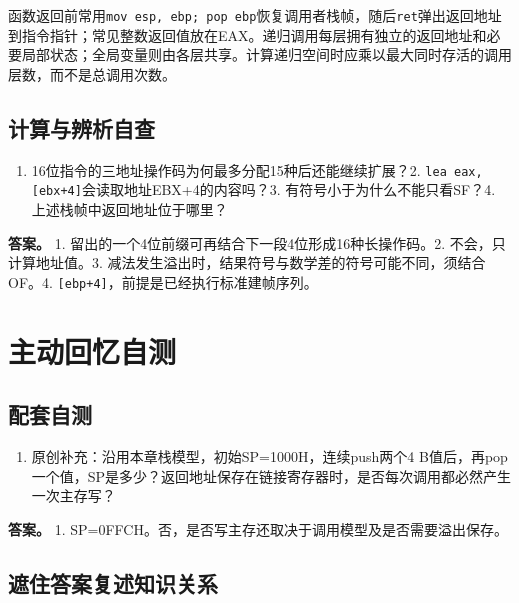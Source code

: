 函数返回前常用\texttt{mov esp,\allowbreak{} ebp;\allowbreak{} pop ebp}恢复调用者栈帧，随后\texttt{ret}弹出返回地址到指令指针；常见整数返回值放在EAX。递归调用每层拥有独立的返回地址和必要局部状态；全局变量则由各层共享。计算递归空间时应乘以最大同时存活的调用层数，而不是总调用次数。

\subsection{计算与辨析自查}\label{CO04-extra-check}

\begin{enumerate}
\def\labelenumi{\arabic{enumi}.}
\tightlist
\item
  16位指令的三地址操作码为何最多分配15种后还能继续扩展？2. \texttt{lea eax,\allowbreak{}[\allowbreak{}ebx+\allowbreak{}4]\allowbreak{}}会读取地址EBX+4的内容吗？3. 有符号小于为什么不能只看SF？4. 上述栈帧中返回地址位于哪里？
\end{enumerate}

\textbf{答案。} 1. 留出的一个4位前缀可再结合下一段4位形成16种长操作码。2. 不会，只计算地址值。3. 减法发生溢出时，结果符号与数学差的符号可能不同，须结合OF。4. \texttt{[\allowbreak{}ebp+\allowbreak{}4]\allowbreak{}}，前提是已经执行标准建帧序列。

\section{主动回忆自测}\label{CO04-recall}

\subsection{配套自测}\label{CO04-15}

\begin{enumerate}
\def\labelenumi{\arabic{enumi}.}
\tightlist
\item
  原创补充：沿用本章栈模型，初始SP=1000H，连续push两个4 B值后，再pop一个值，SP是多少？返回地址保存在链接寄存器时，是否每次调用都必然产生一次主存写？
\end{enumerate}

\textbf{答案。} 1. SP=0FFCH。否，是否写主存还取决于调用模型及是否需要溢出保存。

\subsection{遮住答案复述知识关系}\label{CO04-recall-new}

